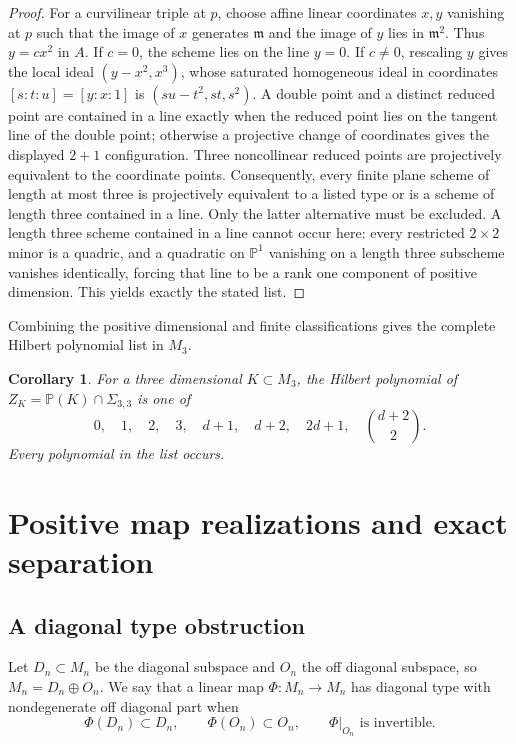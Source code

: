 \documentclass[11pt]{amsart}
\newcommand{\chg}[1]{#1}
\theoremstyle{plain}
\newtheorem{corollary}[theorem]{Corollary}
\theoremstyle{definition}
\theoremstyle{remark}
\begin{document}
\begin{proof}
{For a curvilinear triple at $p$, choose affine linear coordinates $x,y$ vanishing at $p$ such that the image of $x$ generates $\mathfrak m$ and the image of $y$ lies in $\mathfrak m^2$. Thus $y=cx^2$ in $A$. If $c=0$, the scheme lies on the line $y=0$. If $c\ne0$, rescaling $y$ gives the local ideal $(y-x^2,x^3)$, whose saturated homogeneous ideal in coordinates $[s:t:u]=[y:x:1]$ is $(su-t^2,st,s^2)$. A double point and a distinct reduced point are contained in a line exactly when the reduced point lies on the tangent line of the double point; otherwise a projective change of coordinates gives the displayed $2+1$ configuration. Three noncollinear reduced points are projectively equivalent to the coordinate points. Consequently, every finite plane scheme of length at most three is projectively equivalent to a listed type or is a scheme of length three contained in a line. Only the latter alternative must be excluded.
} A length three scheme contained in a line cannot occur here: every restricted $2\times2$ minor is a quadric, and a quadratic on $\mathbb P^1$ vanishing on a length three subscheme vanishes identically, forcing that line to be a \chg{rank one component of positive dimension}. This yields exactly the stated list.
\end{proof}

\chg{Combining the positive dimensional and finite classifications gives the complete Hilbert polynomial list in $M_3$.}

\begin{corollary}\label{cor:hilbert-list}
For a \chg{three dimensional} $K\subset M_3$, the Hilbert polynomial of $Z_K=\mathbb P(K)\cap\Sigma_{3,3}$ is one of
\[
0,\quad1,\quad2,\quad3,\quad d+1,\quad d+2,\quad2d+1,\quad\binom{d+2}{2}.
\]
Every polynomial in the list occurs.
\end{corollary}

\section{Positive map realizations and exact separation}\label{sec:positive-maps}

\subsection{A \chg{diagonal type} obstruction}

Let $D_n\subset M_n$ be the diagonal subspace and $O_n$ the \chg{off diagonal} subspace, so $M_n=D_n\oplus O_n$. We say that a linear map $\Phi:M_n\to M_n$ has \chg{diagonal type} with nondegenerate \chg{off diagonal} part when
\[
\Phi(D_n)\subset D_n,\qquad
\Phi(O_n)\subset O_n,\qquad
\Phi|_{O_n}\text{ is invertible}.
\]
\end{document}
